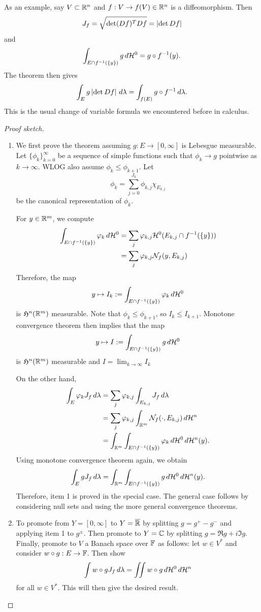 \documentclass[a4paper]{article}
\renewcommand{\seqinfk}[1]{\{ #1 \}_{k=0}^\infty}
\renewcommand{\sumj}{\sum_{j=0}}
\begin{document}
\begin{eg}
As an example, say $V \subset \mathbb{R}^n$ and
$f : V \to f(V) \in \mathbb{R}^n$ is a diffeomorphism.
Then
\[
J_f = \sqrt{\det (Df)^T Df} = \left\lvert \det Df\right\rvert
\]
and
\[
\int_{E \cap f^{-1}(\{y\})} g \, d \mathcal{H}^0 =
g \circ f^{-1}(y).
\]
The theorem then gives
\[
\int_E g \left\lvert \det Df\right\rvert \, d \lambda
= \int_{f(E)} g \circ f^{-1} \, d \lambda.
\]
This is the usual change of variable formula we encountered
before in calculus.
\end{eg}

\begin{proof}[Proof sketch]
\begin{enumerate}
\item We first prove the theorem assuming $g : E \to [0, \infty]$
is Lebesgue measurable. Let $\seqinfk{\phi_k}$ be a sequence
of simple functions such that $\phi_k \to g$ pointwise
as $k \to \infty$. WLOG also assume $\phi_k \leq \phi_{k+1}$.
Let
\[
\phi_k = \sumj^{J_k} \phi_{k, j} \chi_{E_{k, j}}
\]
be the canonical representation of $\phi_k$.

For $y \in \mathbb{R}^m$, we compute
\[
\begin{aligned}
\int_{E \cap f^{-1}(\{y\})} \varphi_k \, d \mathcal{H}^0
&= \sum_j \varphi_{k, j} \mathcal{H}^0(E_{k, j} \cap f^{-1}(\{y\})) \\
&= \sum_j \varphi_{k, j} \mathcal{N}_f (y, E_{k, j})
\end{aligned}
\]
Therefore, the map
\[
y \mapsto I_k := \int_{E \cap f^{-1}(\{y\})} \varphi_k
\, d \mathcal{H}^0
\]
is $\mathfrak{H}^n(\mathbb{R}^m)$ measurable.
Note that $\phi_k \leq \phi_{k+1}$, so $I_k \leq I_{k+1}$.
Monotone convergence theorem then implies that the map
\[
y \mapsto I := \int_{E \cap f^{-1}(\{y\})} g \, d \mathcal{H}^0
\]
is $\mathfrak{H}^n(\mathbb{R}^m)$ measurable
and $I = \lim_{k \to \infty} I_k$

On the other hand,
\[
\begin{aligned}
\int_E \varphi_k J_f \, d \lambda
&= \sum_j \varphi_{k, j} \int_{E_{k, j}} J_f \, d \lambda \\
&= \sum_j \varphi_{k, j} \int_{\mathbb{R}^m} \mathcal{N}_f(\cdot, E_{k, j})
\, d \mathcal{H}^n \\
&= \int_{\mathbb{R}^m} \int_{E \cap f^{-1}(\{y\})}
\varphi_k \, d \mathcal{H}^0 \, d \mathcal{H}^n(y).
\end{aligned}
\]
Using monotone convergence theorem again, we obtain
\[
\int_E g J_f \, d \lambda =
\int_{\mathbb{R}^m} \int_{E \cap f^{-1}(\{y\})}
g \, d \mathcal{H}^0 \, d \mathcal{H}^n (y).
\]
Therefore, item 1 is proved in the special case.
The general case follows by considering null sets and
using the more general convergence theorems.

\item To promote from $Y = [0, \infty]$
to $Y = \overline{\mathbb{R}}$ by splitting $g = g^+ - g^-$ and
applying item 1 to $g^{\pm}$. Then promote to
$Y = \mathbb{C}$ by splitting $g = \Re g + i \Im g$.
Finally, promote to $V$ a Banach space over $\mathbb{F}$ as follows:
let $w \in V^*$ and consider $w \circ g : E \to \mathbb{F}$.
Then show
\[
\int w \circ g J_f \, d \lambda = \iint w \circ g \, d \mathcal{H}^0 \, d \mathcal{H}^n
\]
for all $w \in V^*$. This will then give the desired
result.

\end{enumerate}
\end{proof}
\end{document}
